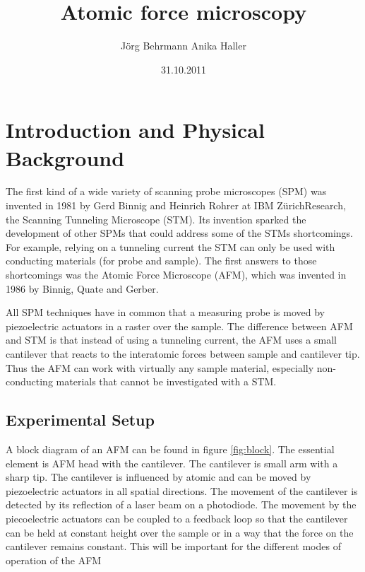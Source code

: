 \documentclass[a4paper,twoside,11pt]{scrartcl}
\begin{document}
\title{Atomic force microscopy}
\author{J\"org Behrmann \qquad Anika Haller}
\date{31.10.2011}
\maketitle
\tableofcontents
\thispagestyle{empty}
\clearpage

\section{Introduction and Physical Background}

The first kind of a wide variety of scanning probe microscopes (SPM) was invented in 1981 by Gerd Binnig and Heinrich Rohrer at IBM ZürichResearch, the Scanning Tunneling Microscope (STM). Its invention sparked the development of other SPMs that could address some of the STMs shortcomings. For example, relying on a tunneling current the STM can only be used with conducting materials (for probe and sample).
The first answers to those shortcomings was the Atomic Force Microscope (AFM), which was invented in 1986 by Binnig, Quate and Gerber.

All SPM techniques have in common that a measuring probe is moved by piezoelectric actuators in a raster over the sample. The difference between AFM and STM is that instead of using a tunneling current, the AFM uses a small cantilever that reacts to the interatomic forces between sample and cantilever tip. Thus the AFM can work with virtually any sample material, especially non-conducting materials that cannot be investigated with a STM. 

\subsection{Experimental Setup \label{sec:setup}}

A block diagram of an AFM can be found in figure \ref{fig:block}. The essential element is AFM head with the cantilever. The cantilever is small arm with a sharp tip. The cantilever is influenced by atomic and can be moved by piezoelectric actuators in all spatial directions. The movement of the cantilever is detected by its reflection of a laser beam on a photodiode.
The movement by the piecoelectric actuators can be coupled to a feedback loop so that the cantilever can be held at constant height over the sample or in a way that the force on the cantilever remains constant. This will be important for the different modes of operation of the AFM
\end{document}
